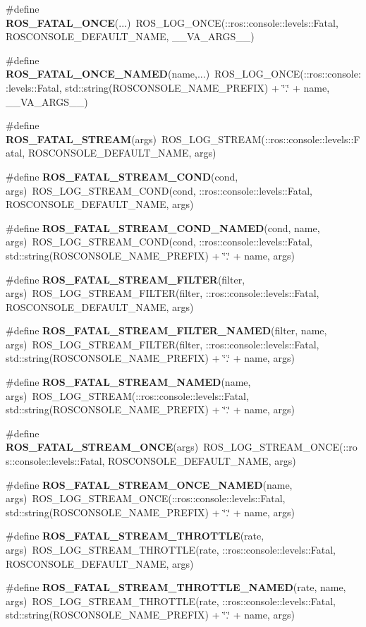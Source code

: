 \begin{DoxyCompactItemize}
\item 
\#define {\bf ROS\_\-FATAL\_\-ONCE}(...)~ROS\_\-LOG\_\-ONCE(::ros::console::levels::Fatal, ROSCONSOLE\_\-DEFAULT\_\-NAME, \_\-\_\-VA\_\-ARGS\_\-\_\-)
\item 
\#define {\bf ROS\_\-FATAL\_\-ONCE\_\-NAMED}(name,...)~ROS\_\-LOG\_\-ONCE(::ros::console::levels::Fatal, std::string(ROSCONSOLE\_\-NAME\_\-PREFIX) + \char`\"{}.\char`\"{} + name, \_\-\_\-VA\_\-ARGS\_\-\_\-)
\item 
\#define {\bf ROS\_\-FATAL\_\-STREAM}(args)~ROS\_\-LOG\_\-STREAM(::ros::console::levels::Fatal, ROSCONSOLE\_\-DEFAULT\_\-NAME, args)
\item 
\#define {\bf ROS\_\-FATAL\_\-STREAM\_\-COND}(cond, args)~ROS\_\-LOG\_\-STREAM\_\-COND(cond, ::ros::console::levels::Fatal, ROSCONSOLE\_\-DEFAULT\_\-NAME, args)
\item 
\#define {\bf ROS\_\-FATAL\_\-STREAM\_\-COND\_\-NAMED}(cond, name, args)~ROS\_\-LOG\_\-STREAM\_\-COND(cond, ::ros::console::levels::Fatal, std::string(ROSCONSOLE\_\-NAME\_\-PREFIX) + \char`\"{}.\char`\"{} + name, args)
\item 
\#define {\bf ROS\_\-FATAL\_\-STREAM\_\-FILTER}(filter, args)~ROS\_\-LOG\_\-STREAM\_\-FILTER(filter, ::ros::console::levels::Fatal, ROSCONSOLE\_\-DEFAULT\_\-NAME, args)
\item 
\#define {\bf ROS\_\-FATAL\_\-STREAM\_\-FILTER\_\-NAMED}(filter, name, args)~ROS\_\-LOG\_\-STREAM\_\-FILTER(filter, ::ros::console::levels::Fatal, std::string(ROSCONSOLE\_\-NAME\_\-PREFIX) + \char`\"{}.\char`\"{} + name, args)
\item 
\#define {\bf ROS\_\-FATAL\_\-STREAM\_\-NAMED}(name, args)~ROS\_\-LOG\_\-STREAM(::ros::console::levels::Fatal, std::string(ROSCONSOLE\_\-NAME\_\-PREFIX) + \char`\"{}.\char`\"{} + name, args)
\item 
\#define {\bf ROS\_\-FATAL\_\-STREAM\_\-ONCE}(args)~ROS\_\-LOG\_\-STREAM\_\-ONCE(::ros::console::levels::Fatal, ROSCONSOLE\_\-DEFAULT\_\-NAME, args)
\item 
\#define {\bf ROS\_\-FATAL\_\-STREAM\_\-ONCE\_\-NAMED}(name, args)~ROS\_\-LOG\_\-STREAM\_\-ONCE(::ros::console::levels::Fatal, std::string(ROSCONSOLE\_\-NAME\_\-PREFIX) + \char`\"{}.\char`\"{} + name, args)
\item 
\#define {\bf ROS\_\-FATAL\_\-STREAM\_\-THROTTLE}(rate, args)~ROS\_\-LOG\_\-STREAM\_\-THROTTLE(rate, ::ros::console::levels::Fatal, ROSCONSOLE\_\-DEFAULT\_\-NAME, args)
\item 
\#define {\bf ROS\_\-FATAL\_\-STREAM\_\-THROTTLE\_\-NAMED}(rate, name, args)~ROS\_\-LOG\_\-STREAM\_\-THROTTLE(rate, ::ros::console::levels::Fatal, std::string(ROSCONSOLE\_\-NAME\_\-PREFIX) + \char`\"{}.\char`\"{} + name, args)

\end{DoxyCompactItemize}
